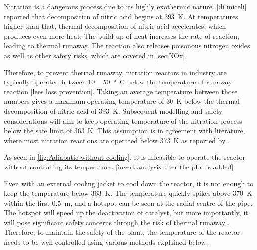 Nitration is a dangerous process due to its highly exothermic nature. [di miceli] reported that decomposition of nitric acid begins at \SI{393}{\K}. At temperatures higher than that, thermal decomposition of nitric acid accelerates, which produces even more heat. The build-up of heat increases the rate of reaction, leading to thermal runaway. The reaction also releases poisonous nitrogen oxides as well as other safety risks, which are covered in \cref{sec:NOx}. 

Therefore, to prevent thermal runaway, nitration reactors in industry are typically operated between \si{10} – \SI{50}{°C} below the temperature of runaway reaction [lees loss prevention]. Taking an average temperature between those numbers gives a maximum operating temperature of \SI{30}{\K} below the thermal decomposition of nitric acid of \SI{393}{\K}. Subsequent modelling and safety considerations will aim to keep operating temperature of the nitration process below the safe limit of \SI{363}{\K}. This assumption is in agreement with literature, where most nitration reactions are operated below \SI{373}{\K} as reported by \textcite{chen_experimental_1998}.

As seen in \cref{fig:Adiabatic-without-cooling}, it is infeasible to operate the reactor without controlling its temperature. [insert analysis after the plot is added]

Even with an external cooling jacket to cool down the reactor, it is not enough to keep the temperature below \SI{363}{\K}. The temperature quickly spikes above \SI{370}{\K} within the first \SI{0.5}{\m}, and a hotspot can be seen at the radial centre of the pipe. The hotspot will speed up the deactivation of catalyst, but more importantly, it will pose significant safety concerns through the risk of thermal runaway \cite{nguyen_flow_1994}. Therefore, to maintain the safety of the plant, the temperature of the reactor needs to be well-controlled using various methods explained below.

